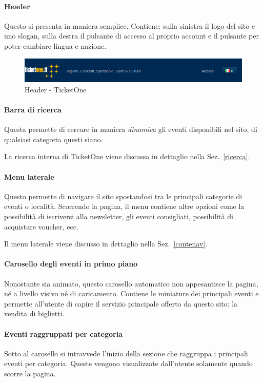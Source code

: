 	\paragraph{Header} Questo si presenta in maniera semplice. 
	Contiene: sulla sinistra il logo del sito e uno slogan, sulla destra il pulsante di accesso al proprio account e il pulsante per poter cambiare lingua e nazione.
	\begin{figure}
		\centering
		\includegraphics[width=\textwidth]{img/header.png}
		\caption{Header - TicketOne}
		\label{header}
	\end{figure}

	\paragraph{Barra di ricerca} Questa permette di cercare in maniera \textit{dinamica} gli eventi disponibili nel sito, di qualsiasi categoria questi siano.
	\par La ricerca interna di TicketOne viene discussa in dettaglio nella Sez.~\ref{ricerca}.
		
	\paragraph{Menu laterale} Questo permette di navigare il sito spostandosi tra le principali categorie di eventi o località.
	Scorrendo la pagina, il menu contiene altre opzioni come la possibilità di iscriversi alla newsletter, gli eventi consigliati, possibilità di acquistare voucher, ecc.
	\par Il menu laterale viene discusso in dettaglio nella Sez.~\ref{contenav}.
	
	\paragraph{Carosello degli eventi in primo piano} Nonostante sia animato, questo carosello automatico non appesantisce la pagina, né a livello visivo né di caricamento.
	Contiene le miniature dei principali eventi e permette all'utente di capire il servizio principale offerto da questo sito: la vendita di biglietti.
	
	\paragraph{Eventi raggruppati per categoria} Sotto al carosello si intravvede l'inizio della sezione che raggruppa i principali eventi per categoria.
	Queste vengono visualizzate dall'utente solamente quando scorre la pagina.

